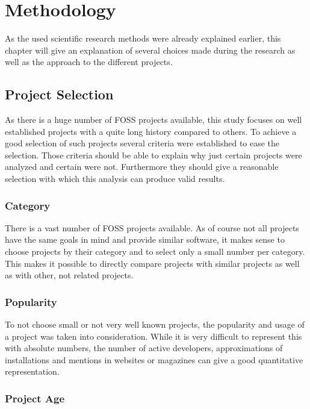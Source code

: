 \chapter{Methodology} %
\label{chap:methodology}

As the used scientific research methods were already explained earlier, this
chapter will give an explanation of several choices made during the research as
well as the approach to the different projects.

\section{Project Selection} %

As there is a huge number of \ac{FOSS} projects available, this study focuses
on well established projects with a quite long history compared to others. To
achieve a good selection of such projects several criteria were established to
ease the selection. Those criteria should be able to explain why just certain
projects were analyzed and certain were not. Furthermore they should give a
reasonable selection with which this analysis can produce valid results.

\subsection{Category} %

There is a vast number of \ac{FOSS} projects available. As of course not all
projects have the same goals in mind and provide similar software, it makes
sense to choose projects by their category and to select only a small number
per category. This makes it possible to directly compare projects with similar
projects as well as with other, not related projects.


\subsection{Popularity} %

To not choose small or not very well known projects, the popularity and usage
of a project was taken into consideration. While it is very difficult to
represent this with absolute numbers, the number of active developers,
approximations of installations and mentions in websites or magazines can give
a good quantitative representation.


\subsection{Project Age} %

